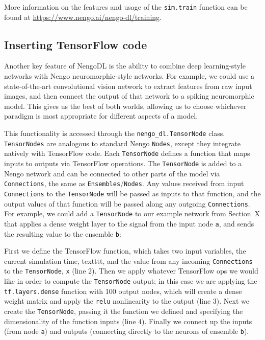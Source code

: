 \documentclass{article}
\begin{document}
More information on the features and usage of the \texttt{sim.train} function can be found at \url{https://www.nengo.ai/nengo-dl/training}.

\subsection{Inserting TensorFlow code}
\label{sec:tensornode}

Another key feature of NengoDL is the ability to combine deep learning-style networks with Nengo neuromorphic-style networks.  For example, we could use a state-of-the-art convolutional vision network to extract features from raw input images, and then connect the output of that network to a spiking neuromorphic model.  This gives us the best of both worlds, allowing us to choose whichever paradigm is most appropriate for different aspects of a model.

This functionality is accessed through the \texttt{nengo\_dl.TensorNode} class.  \texttt{TensorNodes} are analogous to standard Nengo \texttt{Nodes}, except they integrate natively with TensorFlow code.  Each \texttt{TensorNode} defines a function that maps inputs to outputs via TensorFlow operations.  The \texttt{TensorNode} is added to a Nengo network and can be connected to other parts of the model via \texttt{Connections}, the same as \texttt{Ensembles}/\texttt{Nodes}.  Any values received from input \texttt{Connections} to the \texttt{TensorNode} will be passed as inputs to that function, and the output values of that function will be passed along any outgoing \texttt{Connections}.  For example, we could add a \texttt{TensorNode} to our example network from Section~X that applies a dense weight layer to the signal from the input node \texttt{a}, and sends the resulting value to the ensemble \texttt{b}:



First we define the TensorFlow function, which takes two input variables, the current simulation time, texttt{t}, and the value from any incoming \texttt{Connections} to the \texttt{TensorNode}, \texttt{x} (line 2).  Then we apply whatever TensorFlow ops we would like in order to compute the \texttt{TensorNode} output; in this case we are applying the \texttt{tf.layers.dense} function with 100 output nodes, which will create a dense weight matrix and apply the \texttt{relu} nonlinearity to the output (line 3).  Next we create the \texttt{TensorNode}, passing it the function we defined and specifying the dimensionality of the function inputs (line 4).  Finally we connect up the inputs (from node \texttt{a}) and outputs (connecting directly to the neurons of ensemble \texttt{b}).
\end{document}
